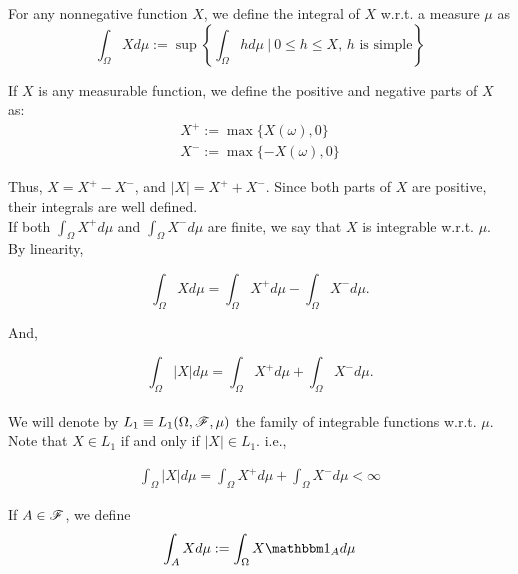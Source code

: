 \documentclass[../TGMAFFIRO.tex]{subfiles}
\begin{document}
\begin{definition}
	For any nonnegative function $X$, we define the integral of $X$ w.r.t. a measure $\mu$ as
	\begin{equation}\label{def:lebesgue_integral}
		\int_\Omega Xd\mu := \sup\left\{\int_\Omega h d\mu \ | \ 0 \leq h \leq X \text{, $h$ is simple}\right\}
	\end{equation}
\end{definition}

If $X$ is any measurable function, we define the positive and negative parts of $X$ as:
\begin{align}
	X^+ := \max\{X(\omega), 0\} \\
	X^- := \max\{-X(\omega), 0\}
\end{align}

Thus, $X = X^+ - X^-$, and $|X| = X^+ + X^-$. Since both parts of $X$ are positive, their integrals are well defined.\\

If both $\int_\Omega X^+ d\mu$ and $\int_\Omega X^- d\mu$ are finite, we say that $X$ is integrable w.r.t. $\mu$. By linearity, 

\begin{equation}
	\int_\Omega X d\mu = \int_\Omega X^+ d\mu - \int_\Omega X^- d\mu.
\end{equation}

And,

\begin{equation}
	\int_\Omega |X| d\mu = \int_\Omega X^+ d\mu + \int_\Omega X^- d\mu.
\end{equation} \\

We will denote by $L_1 \equiv L_1(\Omega, \mathscr{F}, \mu)$ the family of integrable functions w.r.t. $\mu$. Note that $X \in L_1$ if and only if $|X| \in L_1$. i.e.,

\begin{align}
	\int_\Omega |X| d\mu = \int_\Omega X^+ d\mu + \int_\Omega X^- d\mu < \infty
\end{align}

If $A \in \mathscr{F}$, we define
\begin{equation}
	\int_A X d\mu := \int_\Omega X \ind_A d\mu
\end{equation}
\end{document}
